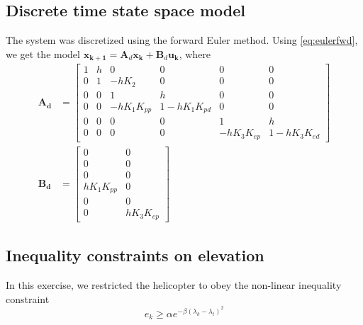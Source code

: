 \subsection{Discrete time state space model}
The system was discretized using the forward Euler method. Using \cref{eq:eulerfwd}, we get the model $\mathbf{x_{k+1}} = \mathbf{A}_d\mathbf{x_k}+\mathbf{B}_d \mathbf{u_k}$, where
\begin{subequations}
    \begin{align}
    \mathbf{A_d} &= \begin{bmatrix}
        1 & h & 0           & 0            & 0           & 0         \\
        0 & 1 & -hK_2       & 0            & 0           & 0         \\
        0 & 0 & 1           & h            & 0           & 0         \\
        0 & 0 & -hK_1K_{pp} & 1-hK_1K_{pd} & 0           & 0         \\
        0 & 0 & 0           & 0            & 1           & h         \\
        0 & 0 & 0           & 0            & -hK_3K_{ep} & 1-hK_3K_{ed}
    \end{bmatrix}\\
    \mathbf{B_d} &= \begin{bmatrix}
        0          & 0        \\
        0          & 0        \\
        0          & 0        \\
        hK_1K_{pp} & 0        \\
        0          & 0        \\
        0          & hK_3K_{ep}
    \end{bmatrix}
    \end{align}
\end{subequations}

\subsection{Inequality constraints on elevation}
In this exercise, we restricted the helicopter to obey the non-linear inequality constraint 
\begin{equation}
e_k \geq \alpha e^{-\beta(\lambda_k-\lambda_t)^{2}}
\end{equation}


